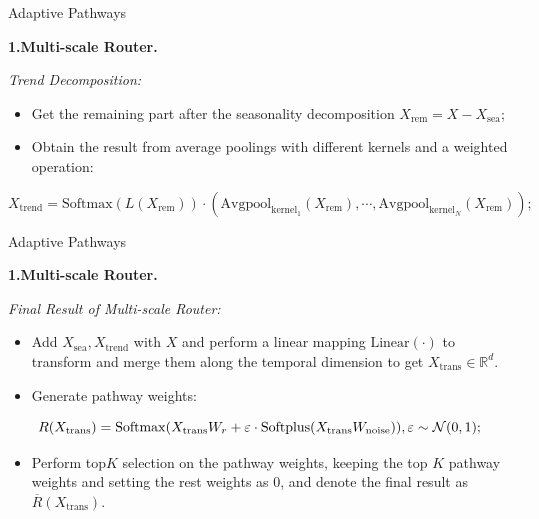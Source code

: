 \documentclass[12pt,aspectratio=169]{beamer}
\begin{document}
\begin{frame}{Adaptive Pathways}

  \textbf{1.Multi-scale Router.}

  \textit{\color{ECNURed}Trend Decomposition:}

  \begin{itemize}

    \item Get the remaining part after the seasonality decomposition
    $X_\mathrm{rem}=X-X_\mathrm{sea}$;

    \item Obtain the result from average poolings with different kernels and a 
    weighted operation:
  \end{itemize}
  {\color{ECNURed}
    $$X_\mathrm{trend}=\mathrm{Softmax}(L(X_\mathrm{rem}))
    \cdot(\mathrm{Avgpool}_{\mathrm{kernel}_1}(X_\mathrm{rem}),\cdots,
    \mathrm{Avgpool}_{\mathrm{kernel}_N}(X_\mathrm{rem}));$$}
\end{frame}

\begin{frame}{Adaptive Pathways}

  \textbf{1.Multi-scale Router.}

  \textit{Final Result of Multi-scale Router:}

  \begin{itemize}

    \item Add $X_\mathrm{sea},X_\mathrm{trend}$ with $X$ and
    perform a linear mapping $\mathrm{Linear}(\cdot)$ to transform and merge
    them along the temporal dimension to get $X_\mathrm{trans}\in\mathbb{R}^{d}.$

    \item Generate pathway weights:

  \end{itemize}

  \vspace{-0.7cm}

  $$R(X_\mathrm{trans})=\mathrm{Softmax}
  (X_\mathrm{trans}W_r+\varepsilon\cdot\mathrm{Softplus}
  (X_\mathrm{trans}W_\mathrm{noise})),\varepsilon\sim{\cal N}(0,1);$$

  \begin{itemize}

    \item Perform top$K$ selection on the pathway weights, keeping the top $K$ 
    pathway weights and setting the rest weights as $0$, and denote the final
    result as {\color{ECNURed}$\overline{R}(X_\mathrm{trans}).$}

  \end{itemize}

\end{frame}
\end{document}
